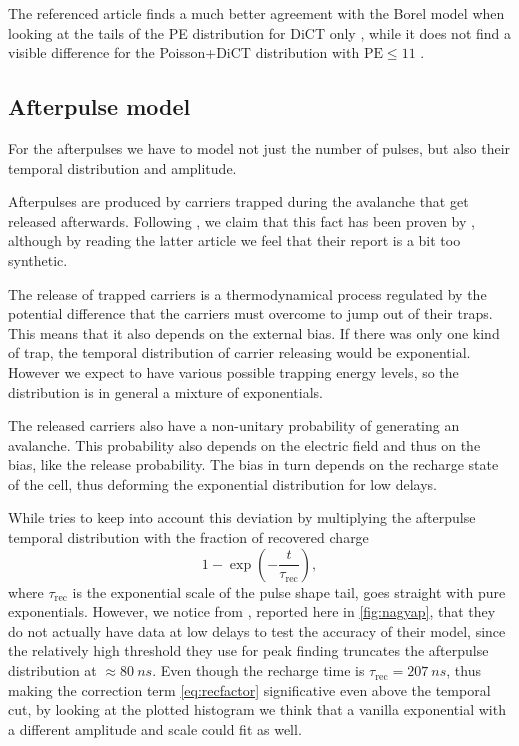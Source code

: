 The referenced article finds a much better agreement with the Borel model when
looking at the tails of the PE distribution for DiCT only
\cite[p.~3~fig.~1]{vinogradov2012}, while it does not find a visible difference
for the Poisson+DiCT distribution with $\text{PE} \le 11$
\cite[p.~4~fig.~2]{vinogradov2012}.

\subsection{Afterpulse model}
\label{sec:aptheory}

For the afterpulses we have to model not just the number of pulses, but also
their temporal distribution and amplitude.

Afterpulses are produced by carriers trapped during the avalanche that get
released afterwards. Following \cite[1]{nagy2014}, we claim that this fact has
been proven by \cite{cova1991}, although by reading the latter article we feel
that their report is a bit too synthetic.

The release of trapped carriers is a thermodynamical process regulated by the
potential difference that the carriers must overcome to jump out of their
traps. This means that it also depends on the external bias. If there was only
one kind of trap, the temporal distribution of carrier releasing would be
exponential. However we expect to have various possible trapping energy levels,
so the distribution is in general a mixture of exponentials.

The released carriers also have a non-unitary probability of generating an
avalanche. This probability also depends on the electric field and thus on the
bias, like the release probability. The bias in turn depends on the recharge
state of the cell, thus deforming the exponential distribution for low delays.

While \cite[2]{nagy2014} tries to keep into account this deviation by
multiplying the afterpulse temporal distribution with the fraction of recovered
charge
%
\begin{equation}
    1 - \exp\left(-\frac{t}{\tau_\text{rec}}\right),
    \label{eq:recfactor}
\end{equation}
%
where $\tau_\text{rec}$ is the exponential scale of the pulse shape tail,
\cite[4]{garutti2014} goes straight with pure exponentials. However, we notice
from \cite[p.~5~fig.~11]{nagy2014}, reported here in \autoref{fig:nagyap}, that
they do not actually have data at low delays to test the accuracy of their
model, since the relatively high threshold they use for peak finding truncates
the afterpulse distribution at $\approx\SI{80}{ns}$. Even though the recharge
time is $\tau_\text{rec} = \SI{207}{ns}$, thus making the correction term
\eqref{eq:recfactor} significative even above the temporal cut, by looking at
the plotted histogram we think that a vanilla exponential with a different
amplitude and scale could fit as well.

